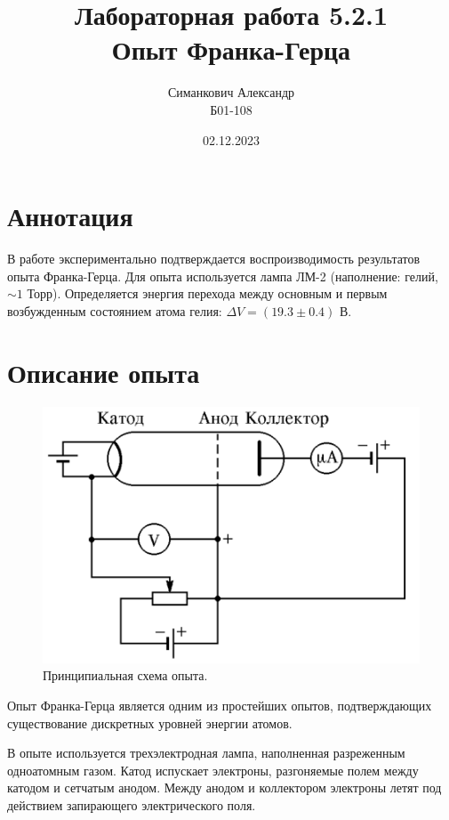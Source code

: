 \documentclass[12pt,a4paper]{article}
\title{Лабораторная работа 5.2.1 \\ Опыт Франка-Герца}
\author{Симанкович Александр\\ Б01-108}
\date{02.12.2023}
\begin{document}
	\maketitle
	
	\section*{Аннотация}
	
	В работе экспериментально подтверждается воспроизводимость результатов опыта Франка-Герца.
	Для опыта используется лампа ЛМ-2 (наполнение: гелий, $\sim 1$ Торр). Определяется энергия перехода между основным и первым возбужденным состоянием атома гелия: $\Delta V = (19.3 \pm 0.4)$ В. 

	\section*{Описание опыта}
	
	\begin{figure}
		\includegraphics[width=\linewidth]{res/simple_scheme.png}
		\caption{Принципиальная схема опыта.}
		\label{fig:simple_scheme}
		\vspace{0pt}
	\end{figure}
	
	Опыт Франка-Герца является одним из простейших опытов, подтверждающих существование дискретных уровней энергии атомов.
	
	В опыте используется трехэлектродная лампа, наполненная разреженным одноатомным газом. Катод испускает электроны, разгоняемые полем между катодом и сетчатым анодом. Между анодом и коллектором электроны летят под действием запирающего электрического поля.
	
\end{document}

